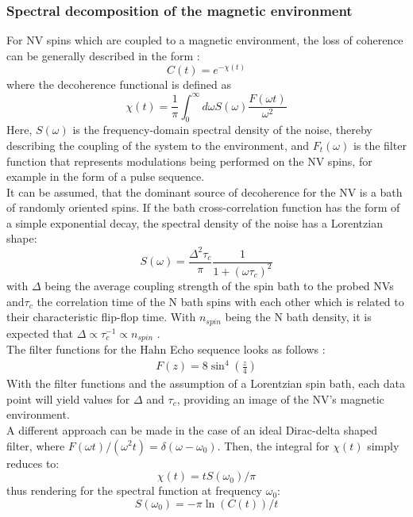 \documentclass[12pt,a4paper]{article}
\begin{document}
\subsubsection*{Spectral decomposition of the magnetic environment}
For NV spins which are coupled to a magnetic environment, the loss of coherence can be generally described  in the form \cite{ssbd}:
\begin{equation}
C(t)=e^{-\chi(t)}
\end{equation}
where the decoherence functional is defined as
\begin{equation}\label{chi}
\chi(t)=\frac{1}{\pi}\int^{\infty}_0d\omega S(\omega)\frac{F(\omega t)}{\omega^2}
\end{equation}
Here, $S(\omega)$ is the frequency-domain spectral density of the noise, thereby describing the coupling of the system to the environment, and $F_t(\omega)$ is the filter function that represents modulations being performed on the NV spins, for example in the form of a pulse sequence.\\
It can be assumed, that the dominant source of decoherence for the NV is a bath of randomly oriented spins\cite{ssbd}. If the bath cross-correlation function has the form of a simple exponential decay, the spectral density of the noise has a Lorentzian shape:
\begin{equation}\label{SD}
S(\omega)=\frac{\Delta^2\tau_c}{\pi}\frac{1}{1+(\omega\tau_c)^2}
\end{equation}
with $\Delta$ being the average coupling strength  of the spin bath to the probed NVs and$\tau_c$ the correlation time of the N bath spins with each other which is related to their characteristic flip-flop time. With $n_{spin}$ being the N bath density, it is expected that $\Delta\propto\tau_c^{-1}\propto n_{spin}$  \cite{ssbd}.\\
The filter functions for the Hahn Echo sequence looks as follows \cite{hted}:
\begin{align}
F(z)=8\sin^4\left(\frac{z}{4}\right)
\end{align}
With the filter functions and the assumption of a Lorentzian spin bath, each data point will yield values for $\Delta$ and $\tau_c$, providing an image of the NV's magnetic environment.\\
A different approach can be made in the case of an ideal Dirac-delta shaped filter, where $F(\omega t)/(\omega^2t)=\delta(\omega-\omega_0)$. Then, the integral for $\chi(t)$ simply reduces to:
\begin{equation}
\chi(t)=tS(\omega_0)/\pi
\end{equation} 
thus rendering for the spectral function at frequency $\omega_0$\cite{ssbd}:
\begin{equation}
S(\omega_0)=-\pi\ln(C(t))/t
\end{equation}
\end{document}
